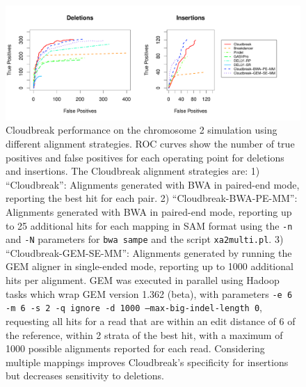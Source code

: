 \documentclass[11pt]{article}
\begin{document}
\begin{figure}
\centering
\includegraphics[width=1\textwidth]{CHR2SIM_ROCS_MULTIPLE_MAPPINGS.pdf}
\caption{Cloudbreak performance on the chromosome 2 simulation using different alignment strategies. ROC curves show the number of true positives and false positives for each operating point for deletions and insertions. The Cloudbreak alignment strategies are: 1) ``Cloudbreak'': Alignments generated with BWA in paired-end mode, reporting the best hit for each pair. 2) ``Cloudbreak-BWA-PE-MM'': Alignments generated with BWA in paired-end mode, reporting up to 25 additional hits for each mapping in SAM format using the \texttt{-n} and \texttt{-N} parameters for \texttt{bwa sampe} and the script \texttt{xa2multi.pl}. 3) ``Cloudbreak-GEM-SE-MM'': Alignments generated by running the GEM aligner in single-ended mode, reporting up to 1000 additional hits per alignment. GEM was executed in parallel using Hadoop tasks which wrap GEM version 1.362 (beta), with parameters \texttt{-e 6 -m 6 -s 2 -q ignore -d 1000 --max-big-indel-length 0},  requesting all hits for a read that are within an edit distance of 6 of the reference, within 2 strata of the best hit, with a maximum of 1000 possible alignments reported for each read. Considering multiple mappings improves Cloudbreak's specificity for insertions but decreases sensitivity to deletions.}
\label{alignment_comparison}
\end{figure}

\clearpage
\end{document}
